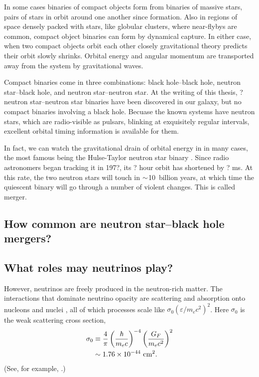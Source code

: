 In some cases binaries of compact objects form from binaries of massive stars,
pairs of stars in orbit around one another since formation. Also in regions of
space densely packed with stars, like globular clusters, where near-flybys are
common, compact object binaries can form by dynamical capture.
In either case, when two compact objects orbit each other closely gravitational
theory predicts their orbit slowly shrinks. Orbital energy and angular momentum
are transported away from the system by gravitational waves.

Compact binaries come in three combinations: black hole--black hole, neutron
star--black hole, and neutron star--neutron star. At the writing of this thesis,
? neutron star--neutron star binaries have been discovered in our galaxy,
but no compact binaries involving a black hole.
Becuase the known systems have neutron stars, which are radio-visible as
pulsars, blinking at exquisitely regular intervals, excellent orbital timing
information is available for them.

In fact, we can watch the gravitational drain of orbital energy in in many
cases, the most famous being the Hulse-Taylor neutron star binary
\citep{huls1974-discovery}.
Since radio astronomers began tracking it in 197?, its ? hour orbit has
shortened by ? ms.
At this rate, the two neutron stars will touch in $\mathord{\sim}$10~billion years,
at which time the quiescent binary will go through a number of violent changes.
This is called merger.

\subsection{How common are neutron star--black hole mergers?}

\subsection{What roles may neutrinos play?}


However, neutrinos are freely produced in the neutron-rich matter. The
interactions that dominate neutrino opacity are scattering and absorption onto
nucleons and nuclei \citep[Sec.\ 11.7]{shap1983-bh_wd_ns}, all of which processes
scale like $\sigma_0(\varepsilon/m_e c^2)^2$. Here $\sigma_0$ is the weak
scattering cross section,
\begin{align}
  \sigma_0
  &\equiv \frac{4}{\pi}\left(\frac{\hbar}{m_e c}\right)^{-4}
  \left(\frac{G_F}{m_e c^2}\right)^2 \\
  &\sim   1.76 \times 10^{-44} \,\, {\rm cm}^2.
\end{align}
(See, for example, \citealt{tubb1975-neutrino_opacities}.)

